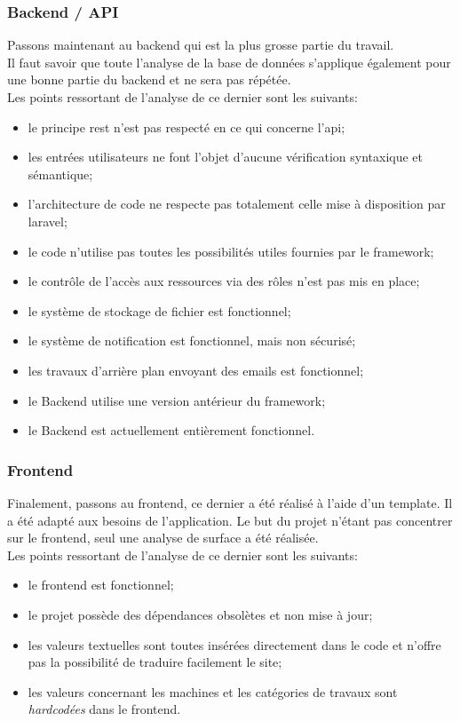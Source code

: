 \documentclass[
    iai, %
    il, %
]{heig-tb}
\begin{document}
\subsubsection{Backend / API}
Passons maintenant au \Gls{backend} qui est la plus grosse partie du travail.\\
Il faut savoir que toute l'analyse de la base de données s'applique également pour une bonne partie du \Gls{backend} et ne sera pas répétée.\\
Les points ressortant de l'analyse de ce dernier sont les suivants:
\begin{itemize}
    \item le principe \Gls{rest} n'est pas respecté en ce qui concerne l'\Gls{api};
    \item les entrées utilisateurs ne font l'objet d'aucune vérification syntaxique et sémantique;
    \item l'architecture de code ne respecte pas totalement celle mise à disposition par \Gls{laravel};
    \item le code n'utilise pas toutes les possibilités utiles fournies par le \Gls{framework};
    \item le contrôle de l'accès aux ressources via des rôles n'est pas mis en place;
    \item le système de stockage de fichier est fonctionnel;
    \item le système de notification est fonctionnel, mais non sécurisé;
    \item les travaux d'arrière plan envoyant des emails est fonctionnel;
    \item le Backend utilise une version antérieur du \Gls{framework};
    \item le Backend est actuellement entièrement fonctionnel.
\end{itemize}

\subsubsection{Frontend}
Finalement, passons au \Gls{frontend}, ce dernier a été réalisé à l'aide d'un \Gls{template}. Il a été adapté aux besoins de l'application. Le but du projet n'étant pas concentrer sur le \Gls{frontend}, seul une analyse de surface a été réalisée.\\
Les points ressortant de l'analyse de ce dernier sont les suivants:
\begin{itemize}
    \item le \Gls{frontend} est fonctionnel;
    \item le projet possède des dépendances obsolètes et non mise à jour;
    \item les valeurs textuelles sont toutes insérées directement dans le code et n'offre pas la possibilité de traduire facilement le site;
    \item les valeurs concernant les machines et les catégories de travaux sont \emph{hardcodées} dans le \Gls{frontend}.
\end{itemize}
\end{document}
